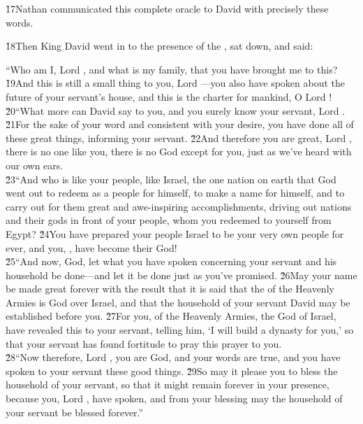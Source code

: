 \v{17}Nathan communicated this complete oracle to David with precisely these words.

\v{18}Then King David went in to the presence of the , sat down, and said:

\begin{poetry}
\poeml ``Who am I, Lord , and what is my family, that you have brought me to this? \v{19}And this is still a small thing to you, Lord ---you also have spoken about the future of your servant's house, and this is the charter for mankind, O Lord ! \\
\poeml \v{20}``What more can David say to you, and you surely know your servant, Lord . \v{21}For the sake of your word and consistent with your desire, you have done all of these great things, informing your servant. \v{22}And therefore you are great, Lord , there is no one like you, there is no God except for you, just as we've heard with our own ears. \\
\poeml \v{23}``And who is like your people, like Israel, the one nation on earth that God went out to redeem as a people for himself, to make a name for himself, and to carry out for them great and awe-inspiring accomplishments, driving out nations and their gods in front of your people, whom you redeemed to yourself from Egypt? \v{24}You have prepared your people Israel to be your very own people for ever, and you, , have become their God! \\
\poeml \v{25}``And now,  God, let what you have spoken concerning your servant and his household be done---and let it be done just as you've promised. \v{26}May your name be made great forever with the result that it is said that the  of the Heavenly Armies is God over Israel, and that the household of your servant David may be established before you. \v{27}For you,  of the Heavenly Armies, the God of Israel, have revealed this to your servant, telling him, `I will build a dynasty for you,' so that your servant has found fortitude to pray this prayer to you. \\
\poeml \v{28}``Now therefore, Lord , you are God, and your words are true, and you have spoken to your servant these good things. \v{29}So may it please you to bless the household of your servant, so that it might remain forever in your presence, because you, Lord , have spoken, and from your blessing may the household of your servant be blessed forever.''
\end{poetry}

